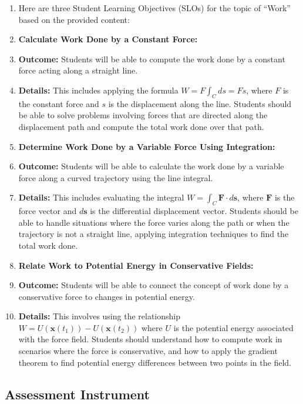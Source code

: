 \begin{enumerate}
    \item Here are three Student Learning Objectives (SLOs) for the topic of ``Work'' based on the provided content:
    \item \textbf{Calculate Work Done by a Constant Force:}
    \item \textbf{Outcome:} Students will be able to compute the work done by a constant force acting along a straight line.
    \item \textbf{Details:} This includes applying the formula $W = F \int_C ds = Fs$, where $F$ is the constant force and $s$ is the displacement along the line. Students should be able to solve problems involving forces that are directed along the displacement path and compute the total work done over that path.
    \item \textbf{Determine Work Done by a Variable Force Using Integration:}
    \item \textbf{Outcome:} Students will be able to calculate the work done by a variable force along a curved trajectory using the line integral.
    \item \textbf{Details:} This includes evaluating the integral $W = \int_C \mathbf{F} \cdot d\mathbf{s}$, where $\mathbf{F}$ is the force vector and $d\mathbf{s}$ is the differential displacement vector. Students should be able to handle situations where the force varies along the path or when the trajectory is not a straight line, applying integration techniques to find the total work done.
    \item \textbf{Relate Work to Potential Energy in Conservative Fields:}
    \item \textbf{Outcome:} Students will be able to connect the concept of work done by a conservative force to changes in potential energy.
    \item \textbf{Details:} This involves using the relationship $W = U(\mathbf{x}(t_1)) - U(\mathbf{x}(t_2))$ where $U$ is the potential energy associated with the force field. Students should understand how to compute work in scenarios where the force is conservative, and how to apply the gradient theorem to find potential energy differences between two points in the field.
\end{enumerate}

\subsection{Assessment Instrument}
\label{ssec:appl-d806}

